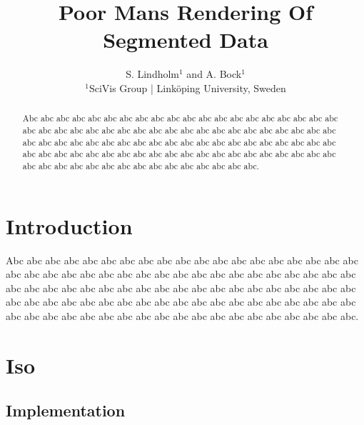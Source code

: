 \documentclass{egpubl}
\title[PMS]%
      {Poor Mans Rendering Of Segmented Data}
\author[S. Lindholm \& A. Bock]
       {S. Lindholm$^{1}$
        and A. Bock$^{1}$
        \\
         $^1$SciVis Group | Link\"{o}ping University, Sweden
       }
\begin{document}

\maketitle

\begin{abstract}
   Abc abc abc abc abc abc abc abc abc abc abc abc abc abc abc abc abc abc abc abc abc abc abc abc abc abc abc abc abc abc abc abc abc abc abc abc abc abc abc abc abc abc abc abc abc abc abc abc abc abc abc abc abc abc abc abc abc abc abc abc abc abc abc abc abc abc abc abc abc abc abc abc abc abc abc abc abc abc abc abc abc abc abc abc abc abc abc abc abc abc abc abc abc abc abc.

\begin{classification} %
\end{classification}

\end{abstract}





\section{Introduction}

   Abc abc abc abc abc abc abc abc abc abc abc abc abc abc abc abc abc abc abc abc abc abc abc abc abc abc abc abc abc abc abc abc abc abc abc abc abc abc abc abc abc abc abc abc abc abc abc abc abc abc abc abc abc abc abc abc abc abc abc abc abc abc abc abc abc abc abc abc abc abc abc abc abc abc abc abc abc abc abc abc abc abc abc abc abc abc abc abc abc abc abc abc abc abc abc.

\cite{Bishop2006}

\section{Iso}

\subsection{Implementation}
\end{document}
